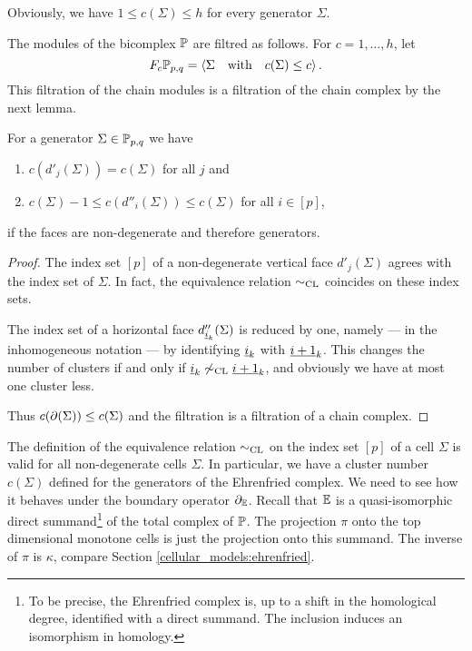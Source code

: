 \begin{rem}
    Obviously, we have $1 \leq c(\Sigma) \leq h$ for every generator $\Sigma$.
\end{rem}

\begin{defi}
    \label{css:cluster_filtration_of_PP}
    The modules of the bicomplex $\PP$ are filtred as follows.
    For $c = 1, \ldots, h$, let
    \[
        F_c\PP_{p,q} = \langle  \Sigma \mspc{with}{10} c(\Sigma) \leq c \rangle \,.
    \]
    This filtration of the chain modules is a filtration of the chain complex by the next lemma. 
\end{defi}

\begin{lem}
    \label{css:c_induces_a_filtration}
    For a generator $\Sigma \in \PP_{p,q}$ we have
    \begin{enumerate}
        \item \label{css:c_induces_a_filtration_vertical} $c( d'_j(\Sigma) ) = c(\Sigma)$ for all $j$ and
        \item \label{css:c_induces_a_filtration_horizontal} $c( \Sigma ) -1 \leq c( d''_i( \Sigma ) ) \leq c(\Sigma)$ for all $i \in [p]$,
    \end{enumerate}
    if the faces are non-degenerate and therefore generators.
\end{lem}
\begin{proof}
    The index set $[p]$ of a non-degenerate vertical face $d'_j(\Sigma)$ agrees with the index set of $\Sigma$.
    In fact, the equivalence relation $\equicl$ coincides on these index sets.
    
    The index set of a horizontal face $d''_{\ul i_k}(\Sigma)$ is reduced by one, namely --- in the inhomogeneous notation --- by identifying $\ul i_k$ with $\ul{i+1}_k$.
    This changes the number of clusters if and only if $\ul i_k \not\equicl \ul{i+1}_k$, and obviously we have at most one cluster less.
    
    Thus $c(\del(\Sigma)) \leq c(\Sigma)$ and the filtration is a filtration of a chain complex. 
\end{proof}

The definition of the equivalence relation $\equicl$ on the index set $[p]$ of a cell $\Sigma$ is valid for all non-degenerate cells $\Sigma$.
In particular, we have a cluster number $c(\Sigma)$ defined for the generators of the Ehrenfried complex.
We need to see how it behaves under the boundary operator $\del_\E$.
Recall that $\E$ is a quasi-isomorphic direct summand\footnote{%
    To be precise, the Ehrenfried complex is, up to a shift in the homological degree, identified with a direct summand.
    The inclusion induces an isomorphism in homology.
} of the total complex of $\PP$.
The projection $\pi$ onto the top dimensional monotone cells is just the projection onto this summand.
The inverse of $\pi$ is $\kappa$, compare Section \ref{cellular_models:ehrenfried}.

